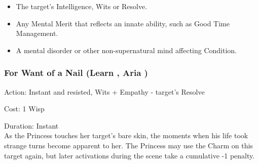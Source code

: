 \begin{itemize}
\item The target's Intelligence, Wits or Resolve.
\item Any Mental Merit that reflects an innate ability, such as Good Time Management.
\item A mental disorder or other non-supernatural mind affecting Condition. 
\end{itemize}


\subsubsection*{For Want of a Nail (Learn \textbullet\textbullet, Aria \textbullet)}

\noindent Action: Instant and resisted, Wits + Empathy - target's Resolve

\noindent Cost: 1 Wisp

\noindent Duration: Instant\\

\noindent As the Princess touches her target's bare skin, the moments when his life took strange turns become apparent to her. The Princess may use the Charm on this target again, but later activations during the scene take a cumulative -1 penalty.

